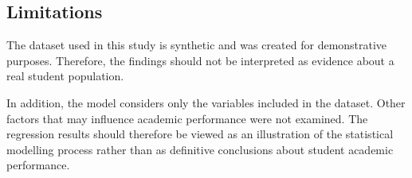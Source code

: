 \subsection{Limitations}

The dataset used in this study is synthetic and was created for demonstrative purposes. Therefore, the findings should not be interpreted as evidence about a real student population.

In addition, the model considers only the variables included in the dataset. Other factors that may influence academic performance were not examined. The regression results should therefore be viewed as an illustration of the statistical modelling process rather than as definitive conclusions about student academic performance.